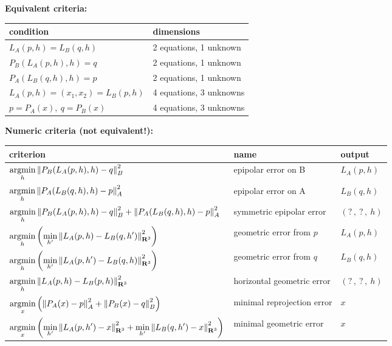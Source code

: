 \clearpage

{\bf Equivalent criteria:}\\
\begin{tabular}{l|l}
condition & dimensions \\
\hline
$L_A(p,h)=L_B(q,h)$  & 2 equations, 1 unknown\\
$P_B(L_A(p,h),h)=q$  & 2 equations, 1 unknown\\
$P_A(L_B(q,h),h)=p$  & 2 equations, 1 unknown\\
$L_A(p,h)=(x_1,x_2)=L_B(p,h)$ & 4 equations, 3 unknowns\\
$p=P_A(x),\ q=P_B(x)$ & 4 equations, 3 unknowns\\
\end{tabular}

{\bf Numeric criteria (not equivalent!):}\\
\begin{tabular}{l|l|l}
	criterion & name & output\\
	\hline
	$\displaystyle\mathop{\rm argmin}_h\displaystyle\left\|P_B(L_A(p,h),h)-q\right\|_B^2$ &
	epipolar error on B & $L_A(p,h)$\\
	$\displaystyle\mathop{\rm argmin}_h\left\|P_A(L_B(q,h),h)-p\right\|_A^2$ &
	epipolar error on A &$L_B(q,h)$\\
	$\displaystyle\mathop{\rm argmin}_h
	\left\|P_B(L_A(p,h),h)-q\right\|_B^2
	+
	\left\|P_A(L_B(q,h),h)-p\right\|_A^2 $ &
	symmetric epipolar error & $(?\,,\ ?\,,\ h)$ \\
	$\displaystyle\mathop{\rm argmin}_h\left(\min_{h'}\left\|L_A(p,h)-L_B(q,h')\right\|^2_{\mathbf{R}^3}\right)$ &
	geometric error from $p$ & $L_A(p,h)$ \\
	$\displaystyle\mathop{\rm argmin}_h\left(\min_{h'}\left\|L_A(p,h')-L_B(q,h)\right\|^2_{\mathbf{R}^3}\right)$ &
	geometric error from $q$ & $L_B(q,h)$ \\
	$\displaystyle\mathop{\rm argmin}_h\left\|L_A(p,h)-L_B(p,h)\right\|_{\mathbf{R}^3}^2$ &
	horizontal geometric error & $(?\,,\ ?\,,\ h)$ \\
	$\displaystyle\mathop{\rm argmin}_x\left(
		\left\|P_A(x)-p\right\|^2_A
		+
		\left\|P_B(x)-q\right\|^2_B
	\right)$ &
	minimal reprojection error & $x$\\
	$\displaystyle\mathop{\rm argmin}_x\left(
	\min_{h'}\left\|L_A(p,h')-x\right\|^2_{\mathbf{R}^3}
	+
	\min_{h'}\left\|L_B(q,h')-x\right\|^2_{\mathbf{R}^3}
	\right)$ & minimal geometric error & $x$
\end{tabular}



